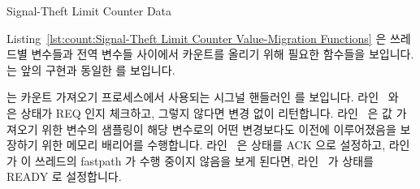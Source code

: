 \begin{listing}[tbp]

\caption{Signal-Theft Limit Counter Data}
\label{lst:count:Signal-Theft Limit Counter Data}
\end{listing}

\begin{fcvref}
Listing~\ref{lst:count:Signal-Theft Limit Counter Value-Migration Functions}
은 쓰레드별 변수들과 전역 변수들 사이에서 카운트를 올리기 위해 필요한 함수들을
보입니다.
 는 앞의 구현과 동일한  를 보입니다.
\end{fcvref}
\begin{fcvref}
 는 카운트 가져오기 프로세스에서 사용되는 시그널 핸들러인
 를 보입니다.
라인~ 와~ 은  상태가 REQ 인지
체크하고, 그렇지 않다면 변경 없이 리턴합니다.
라인~ 은 값 가져오기 위한 변수의 샘플링이 해당 변수로의 어떤
변경보다도 이전에 이루어졌음을 보장하기 위한 메모리 배리어를 수행합니다.
라인~ 은  상태를 ACK 으로 설정하고,
라인~ 가 이 쓰레드의 fastpath 가 수행 중이지 않음을 보게
된다면, 라인~ 가  상태를 READY 로 설정합니다.
\end{fcvref}

\iffalse

